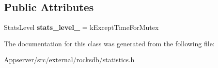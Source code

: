 \subsection*{Public Attributes}
\begin{DoxyCompactItemize}
\item 
Stats\+Level {\bfseries stats\+\_\+level\+\_\+} = k\+Except\+Time\+For\+Mutex\hypertarget{classrocksdb_1_1Statistics_ad8abfdadf7d0f87e86c83373c03dc253}{}\label{classrocksdb_1_1Statistics_ad8abfdadf7d0f87e86c83373c03dc253}

\end{DoxyCompactItemize}


The documentation for this class was generated from the following file\+:\begin{DoxyCompactItemize}
\item 
Appserver/src/external/rocksdb/statistics.\+h\end{DoxyCompactItemize}
